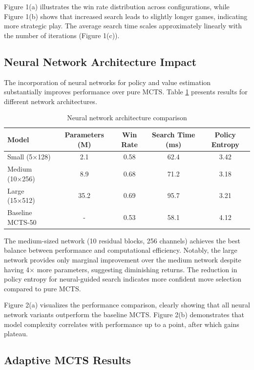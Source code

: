 \documentclass{article}
\begin{document}
Figure 1(a) illustrates the win rate distribution across configurations, while Figure 1(b) shows that increased search leads to slightly longer games, indicating more strategic play. The average search time scales approximately linearly with the number of iterations (Figure 1(c)).

\subsection{Neural Network Architecture Impact}

The incorporation of neural networks for policy and value estimation substantially improves performance over pure MCTS. Table \ref{tab:architecture} presents results for different network architectures.

\begin{table}[h]
\centering
\caption{Neural network architecture comparison}
\label{tab:architecture}
\begin{tabular}{lcccc}
\toprule
Model & Parameters (M) & Win Rate & Search Time (ms) & Policy Entropy \\
\midrule
Small (5×128) & 2.1 & 0.58 & 62.4 & 3.42 \\
Medium (10×256) & 8.9 & 0.68 & 71.2 & 3.18 \\
Large (15×512) & 35.2 & 0.69 & 95.7 & 3.21 \\
Baseline MCTS-50 & - & 0.53 & 58.1 & 4.12 \\
\bottomrule
\end{tabular}
\end{table}

The medium-sized network (10 residual blocks, 256 channels) achieves the best balance between performance and computational efficiency. Notably, the large network provides only marginal improvement over the medium network despite having 4× more parameters, suggesting diminishing returns. The reduction in policy entropy for neural-guided search indicates more confident move selection compared to pure MCTS.

Figure 2(a) visualizes the performance comparison, clearly showing that all neural network variants outperform the baseline MCTS. Figure 2(b) demonstrates that model complexity correlates with performance up to a point, after which gains plateau.

\subsection{Adaptive MCTS Results}
\end{document}

